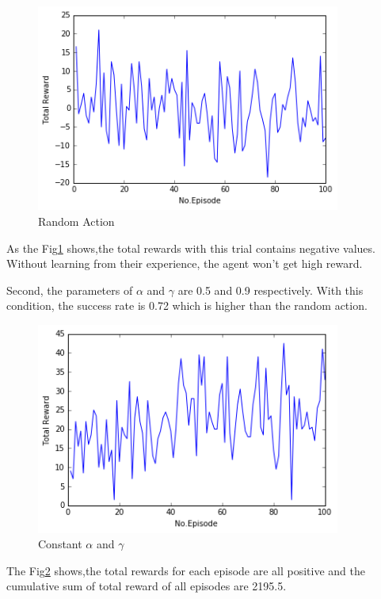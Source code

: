 \documentclass[a4paper,11pt]{article}
\begin{document}
        


\begin{figure}[H]
\begin{center}
\includegraphics[width=100mm]{graph/random.jpg}
\end{center}
\caption{Random Action}
\label{fig:one}
\end{figure}

As the Fig\ref{fig:one} shows,the total rewards with this trial contains negative values.
Without learning from their experience, the agent won't get high reward.



Second, the parameters of $\alpha$ and $\gamma$ are 0.5 and 0.9 respectively.
With this condition, the success rate is 0.72 which is higher than the random action.

\begin{figure}[H]
\begin{center}
\includegraphics[width=100mm]{graph/constant.jpg}
\end{center}
\caption{Constant $\alpha$ and $\gamma$}
\label{fig:two}
\end{figure}

The Fig\ref{fig:two} shows,the total rewards for each episode are all positive and the cumulative sum of total reward of all episodes are 2195.5.
\end{document}
